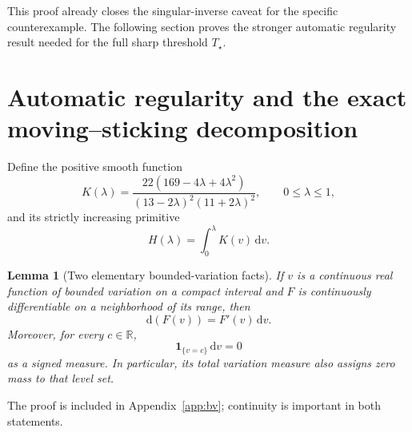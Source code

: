 \documentclass[11pt,a4paper]{article}
\numberwithin{equation}{section}
\newtheorem{lemma}[theorem]{Lemma}
\theoremstyle{definition}
\theoremstyle{remark}
\newcommand{\R}{\mathbb R}
\newcommand{\dd}{\,\mathrm d}
\newcommand{\ind}{\mathbf 1}
\newcommand{\Ts}{T_\star}
\begin{document}
This proof already closes the singular-inverse caveat for the specific counterexample. The following section proves the stronger automatic regularity result needed for the full sharp threshold $\Ts$.

\section{Automatic regularity and the exact moving--sticking decomposition}
\label{sec:regularity}

Define the positive smooth function
\begin{equation}
\label{eq:K}
 K(\lambda)=
 \frac{22(169-4\lambda+4\lambda^2)}
 {(13-2\lambda)^2(11+2\lambda)^2},\qquad 0\le\lambda\le1,
\end{equation}
and its strictly increasing primitive
\begin{equation}
\label{eq:H}
 H(\lambda)=\int_0^\lambda K(v)\dd v.
\end{equation}

\begin{lemma}[Two elementary bounded-variation facts]
\label{lem:bv}
If $v$ is a continuous real function of bounded variation on a compact interval and $F$ is continuously differentiable on a neighborhood of its range, then
\[
 \mathrm d(F(v))=F'(v)\,\mathrm dv.
\]
Moreover, for every $c\in\R$,
\[
 \ind_{\{v=c\}}\,\mathrm dv=0
\]
as a signed measure. In particular, its total variation measure also assigns zero mass to that level set.
\end{lemma}
The proof is included in Appendix~\ref{app:bv}; continuity is important in both statements.
\end{document}
